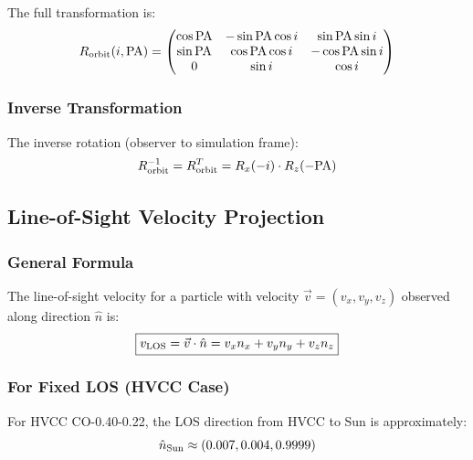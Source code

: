 \documentclass[twocolumn,amsmath,amssymb,prd,superscriptaddress,nofootinbib]{revtex4-2}
\begin{document}
The full transformation is:
\begin{equation}
    R_{\rm orbit}(i, {\rm PA}) = \begin{pmatrix}
    \cos{\rm PA} & -\sin{\rm PA}\cos i & \sin{\rm PA}\sin i \\
    \sin{\rm PA} & \cos{\rm PA}\cos i & -\cos{\rm PA}\sin i \\
    0 & \sin i & \cos i
    \end{pmatrix}
    \label{eq:R_full}
\end{equation}

\subsubsection{Inverse Transformation}

The inverse rotation (observer to simulation frame):
\begin{equation}
    R_{\rm orbit}^{-1} = R_{\rm orbit}^T = R_x(-i) \cdot R_z(-{\rm PA})
    \label{eq:R_inverse}
\end{equation}

\subsection{Line-of-Sight Velocity Projection}
\label{sec:los_velocity}

\subsubsection{General Formula}

The line-of-sight velocity for a particle with velocity $\vec{v} = (v_x, v_y, v_z)$ observed along direction $\hat{n}$ is:
\begin{equation}
    \boxed{v_{\rm LOS} = \vec{v} \cdot \hat{n} = v_x n_x + v_y n_y + v_z n_z}
    \label{eq:v_los}
\end{equation}

\subsubsection{For Fixed LOS (HVCC Case)}

For HVCC CO-0.40-0.22, the LOS direction from HVCC to Sun is approximately:
\begin{equation}
    \hat{n}_{\rm Sun} \approx (0.007, 0.004, 0.9999)
    \label{eq:n_sun}
\end{equation}
\end{document}
